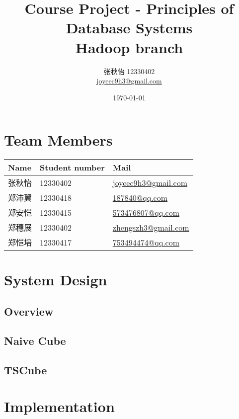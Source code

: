 \documentclass{article}
\begin{document}


\title{Course Project - Principles of Database Systems \\ Hadoop branch}
\author{张秋怡 12330402 \\ \href{mailto:joyeec9h3@gmail.com}{joyeec9h3@gmail.com}} 
\date{\today}
\maketitle

\tableofcontents
\section{Team Members}

\begin{table}[H]
\centering
\begin{tabular}{l l l}
Name              & Student number & Mail \\
\hline
张秋怡 & 12330402 &  \href{mailto:joyeec9h3@gmail.com}{joyeec9h3@gmail.com}  \\
郑沛翼 & 12330418 &  \href{mailto:187840@qq.com}{187840@qq.com}  \\
郑安恺 & 12330415 &  \href{mailto:573476807@qq.com}{573476807@qq.com}  \\
郑穗展 & 12330402 &  \href{mailto:zhengszh3@gmail.com}{zhengszh3@gmail.com}  \\
郑恺培 & 12330417 &  \href{mailto:753494474@qq.com}{753494474@qq.com}
\end{tabular}
\end{table}

\section{System Design}

\subsection{Overview}

\subsection{Naive Cube}

\subsection{TSCube}

\section{Implementation}
\end{document}
